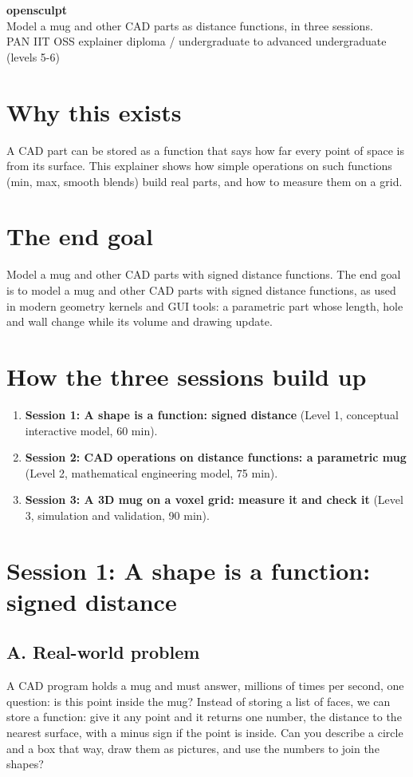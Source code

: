 \documentclass[11pt,a4paper]{article}
\begin{document}
\begin{center}{\LARGE\bfseries opensculpt}\\[0.4em]{\large Model a mug and other CAD parts as distance functions, in three sessions.}\\[0.2em]\small PAN IIT OSS explainer \textbullet{} diploma / undergraduate to advanced undergraduate (levels 5-6)\end{center}

\section*{Why this exists}
A CAD part can be stored as a function that says how far every point of space is from its surface. This explainer shows how simple operations on such functions (min, max, smooth blends) build real parts, and how to measure them on a grid.

\section*{The end goal}
Model a mug and other CAD parts with signed distance functions. The end goal is to model a mug and other CAD parts with signed distance functions, as used in modern geometry kernels and GUI tools: a parametric part whose length, hole and wall change while its volume and drawing update.

\section*{How the three sessions build up}
\begin{enumerate}[nosep]
\item \textbf{Session 1: A shape is a function: signed distance} (Level 1, conceptual interactive model, 60 min).
\item \textbf{Session 2: CAD operations on distance functions: a parametric mug} (Level 2, mathematical engineering model, 75 min).
\item \textbf{Session 3: A 3D mug on a voxel grid: measure it and check it} (Level 3, simulation and validation, 90 min).
\end{enumerate}

\section{Session 1: A shape is a function: signed distance}

\subsection*{A. Real-world problem}
A CAD program holds a mug and must answer, millions of times per second, one question: is this point inside the mug? Instead of storing a list of faces, we can store a function: give it any point and it returns one number, the distance to the nearest surface, with a minus sign if the point is inside. Can you describe a circle and a box that way, draw them as pictures, and use the numbers to join the shapes?
\end{document}
